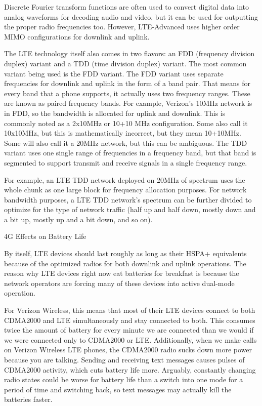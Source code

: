 Discrete Fourier transform functions are often used to convert digital data into analog waveforms for decoding audio and video, but it can be used for outputting the proper radio frequencies too. However, LTE-Advanced uses higher order MIMO configurations for downlink and uplink.

The LTE technology itself also comes in two flavors: an FDD (frequency division duplex) variant and a TDD (time division duplex) variant. The most common variant being used is the FDD variant. The FDD variant uses separate frequencies for downlink and uplink in the form of a band pair. That means for every band that a phone supports, it actually uses two frequency ranges. These are known as paired frequency bands. For example, Verizon’s 10MHz network is in FDD, so the bandwidth is allocated for uplink and downlink. This is commonly noted as a 2x10MHz or 10+10 MHz configuration. Some also call it 10x10MHz, but this is mathematically incorrect, but they mean 10+10MHz. Some will also call it a 20MHz network, but this can be ambiguous. The TDD variant uses one single range of frequencies in a frequency band, but that band is segmented to support transmit and receive signals in a single frequency range.

For example, an LTE TDD network deployed on 20MHz of spectrum uses the whole chunk as one large block for frequency allocation purposes. For network bandwidth purposes, a LTE TDD network’s spectrum can be further divided to optimize for the type of network traffic (half up and half down, mostly down and a bit up, mostly up and a bit down, and so on).


4G Effects on Battery Life

By itself, LTE devices should last roughly as long as their HSPA+ equivalents because of the optimized radios for both downlink and uplink operations. The reason why LTE devices right now eat batteries for breakfast is because the network operators are forcing many of these devices into active dual-mode operation.

For Verizon Wireless, this means that most of their LTE devices connect to both CDMA2000 and LTE simultaneously and stay connected to both. This consumes twice the amount of battery for every minute we are connected than we would if we were connected only to CDMA2000 or LTE. Additionally, when we make calls on Verizon Wireless LTE phones, the CDMA2000 radio sucks down more power because you are talking. Sending and receiving text messages causes pulses of CDMA2000 activity, which cuts battery life more. Arguably, constantly changing radio states could be worse for battery life than a switch into one mode for a period of time and switching back, so text messages may actually kill the batteries faster.

